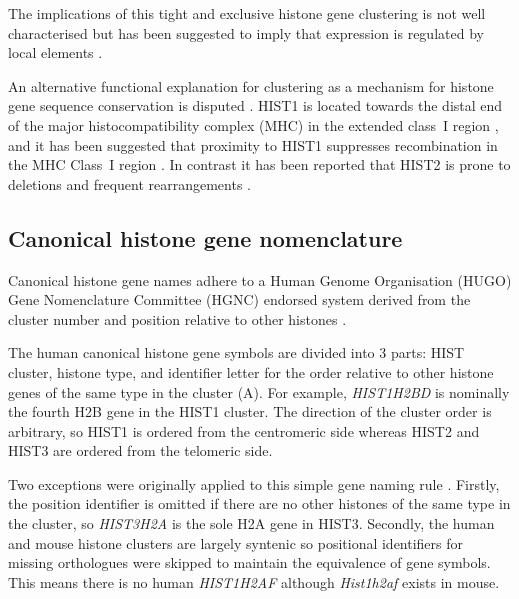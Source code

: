 	The implications of this tight and exclusive histone gene clustering 
	is not well characterised \citep{Eirinlopez2009} 
	but has been suggested to imply that expression is regulated by local elements \citep{close-regulators}.
	
	An alternative functional explanation for clustering as a mechanism for 
	histone gene sequence conservation is disputed \citep{NeiRooney2005}.
	HIST1 is located towards the distal end of the major histocompatibility complex (MHC) 
	in the extended class~I region \citep{MHC-I-transcript, MHC-complete-sequencing-1999}, 
	and it has been suggested that proximity to HIST1 
	suppresses recombination in the MHC Class~I region \citep{MHC-repressed-by-HIST}. 
	In contrast it has been reported that HIST2 is prone to 
	deletions and frequent rearrangements \citep{HISTTwo-prone-deletion-discovery, HISTTwo-prone-deletion-focus}. 

  \subsection{Canonical histone gene nomenclature}
    Canonical histone gene names adhere to a Human Genome Organisation (HUGO) Gene Nomenclature Committee (HGNC) 
	endorsed system derived from the cluster number and position relative to other histones \citep{Marzluff02}.

	The human canonical histone gene symbols are divided into 3 parts: 
	HIST cluster, histone type, and identifier letter
	for the order relative to other histone genes of the same type in the cluster (A).
	For example, \textit{HIST1H2BD} is nominally the fourth H2B gene in the HIST1 cluster.
	The direction of the cluster order is arbitrary, 
	so HIST1 is ordered from the centromeric side 
	whereas HIST2 and HIST3 are ordered from the telomeric side.
	
	Two exceptions were originally applied to this simple gene naming rule \citep{Marzluff02}. 
	Firstly, the position identifier is omitted if there are no other histones of the same type in the cluster, 
	so \textit{HIST3H2A} is the sole H2A gene in HIST3. 
	Secondly, the human and mouse histone clusters are largely syntenic 
	so positional identifiers for missing orthologues were skipped to maintain the equivalence of gene symbols.
	This means there is no human \textit{HIST1H2AF} although \textit{Hist1h2af} exists in mouse.

